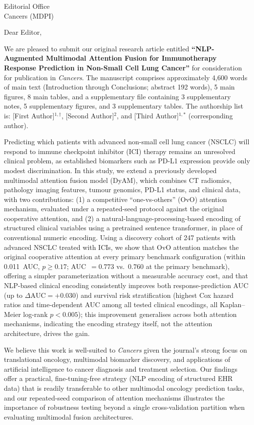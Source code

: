 \documentclass[11pt]{letter}
\begin{document}
\begin{letter}{Editorial Office\\Cancers (MDPI)}

\opening{Dear Editor,}

We are pleased to submit our original research article entitled
\textbf{``NLP-Augmented Multimodal Attention Fusion for Immunotherapy
Response Prediction in Non-Small Cell Lung Cancer''} for consideration for
publication in \emph{Cancers}. The manuscript comprises approximately 4,600
words of main text (Introduction through Conclusions; abstract 192 words),
5 main figures, 8 main tables, and a supplementary file containing 3
supplementary notes, 5 supplementary figures, and 3 supplementary tables.
The authorship list is: [First Author]$^{1,\dagger}$, [Second Author]$^{2}$,
and [Third Author]$^{1,*}$ (corresponding author).

Predicting which patients with advanced non-small cell lung cancer (NSCLC)
will respond to immune checkpoint inhibitor (ICI) therapy remains an
unresolved clinical problem, as established biomarkers such as PD-L1
expression provide only modest discrimination. In this study, we extend a
previously developed multimodal attention fusion model (DyAM), which
combines CT radiomics, pathology imaging features, tumour genomics, PD-L1
status, and clinical data, with two contributions: (1) a competitive
``one-vs-others'' (OvO) attention mechanism, evaluated under a repeated-seed
protocol against the original cooperative attention, and (2) a
natural-language-processing-based encoding of structured clinical variables
using a pretrained sentence transformer, in place of conventional numeric
encoding. Using a discovery cohort of 247 patients with advanced NSCLC
treated with ICIs, we show that OvO attention matches the original
cooperative attention at every primary benchmark configuration (within
0.011~AUC, $p \geq 0.17$; AUC~$=0.773$ vs.\ $0.760$ at the primary
benchmark), offering a simpler parameterization without a measurable
accuracy cost, and that NLP-based clinical encoding
consistently improves both response-prediction AUC (up to
$\Delta\text{AUC}=+0.030$) and survival risk stratification (highest Cox
hazard ratios and time-dependent AUC among all tested clinical encodings,
all Kaplan--Meier log-rank $p<0.005$); this improvement generalises across
both attention mechanisms, indicating the encoding strategy itself, not the
attention architecture, drives the gain.

We believe this work is well-suited to \emph{Cancers} given the journal's
strong focus on translational oncology, multimodal biomarker discovery, and
applications of artificial intelligence to cancer diagnosis and treatment
selection. Our findings offer a practical, fine-tuning-free strategy
(NLP encoding of structured EHR data) that is readily transferable to other
multimodal oncology prediction tasks, and our repeated-seed comparison of
attention mechanisms illustrates the importance of robustness testing beyond
a single cross-validation partition when evaluating multimodal fusion
architectures.


\end{letter}
\end{document}
